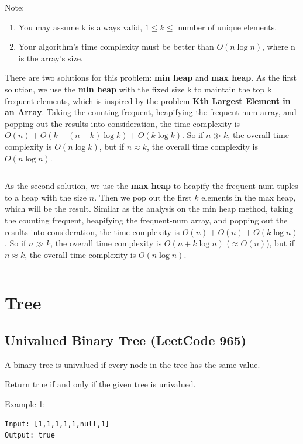 \documentclass[11pt]{article}
\begin{document}
Note:
\begin{enumerate}
	\item You may assume k is always valid, $1 \leq k \leq $ number of unique elements.
	\item Your algorithm's time complexity must be better than $O(n \log n)$, where n is the array's size.
\end{enumerate}


There are two solutions for this problem: \textbf{min heap} and \textbf{max heap}. 
As the first solution, we use the \textbf{min heap} with the fixed size k to maintain the top k frequent elements, which is inspired by the problem \textbf{Kth Largest Element in an Array}.
Taking the counting frequent, heapifying the frequent-num array, and popping out the results into consideration, the time complexity is $O(n)+O(k+(n-k)\log k)+O(k \log k)$. 
So if $n \gg k$, the overall time complexity is $O(n \log k)$, but if $ n \approx k$, the overall time complexity is $O(n \log n)$.

\inputminted[breaklines=true,frame=leftline, linenos=true]{python}{src/topKFrequent.py}

As the second solution, we use the \textbf{max heap} to heapify the frequent-num tuples to a heap with the size $n$. 
Then we pop out the first $k$ elements in the max heap, which will be the result. Similar as the analysis on the min heap method, taking the counting frequent, heapifying the frequent-num array, and popping out the results into consideration, the time complexity is $O(n)+O(n)+O(k \log n)$. 
So if $n \gg k$, the overall time complexity is $O(n+k \log n)$ ($\approx O(n)$), but if $ n \approx k$, the overall time complexity is $O(n \log n)$.


\inputminted[breaklines=true,frame=leftline, linenos=true]{python}{src/topKFrequent_maxHeap.py}

\section{Tree}

\subsection{Univalued Binary Tree (LeetCode 965)}

A binary tree is univalued if every node in the tree has the same value.

Return true if and only if the given tree is univalued.

Example 1:
\begin{verbatim}
Input: [1,1,1,1,1,null,1]
Output: true
\end{verbatim}
\end{document}
